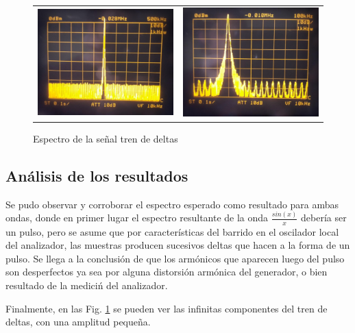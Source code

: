 \begin{figure}[H]
    \centering
    \begin{tabular}{c c}
        \includegraphics[scale=0.185]{../Mediciones/Ejercicio_8/ej8_espectro_deltas.jpeg} &
        \includegraphics[scale=0.18]{../Mediciones/Ejercicio_8/ej8_espectro_deltas_zoom.jpeg}
    \end{tabular}
    \caption{Espectro de la se\~nal tren de deltas}
    \label{fig:ej8_espectro_deltas}
\end{figure}

\subsection{An\'alisis de los resultados}
Se pudo observar y corroborar el espectro esperado como resultado para ambas ondas,
donde en primer lugar el espectro resultante de la onda $\frac{sin(x)}{x}$ deber\'ia ser un pulso,
pero se asume que por caracter\'isticas del barrido en el oscilador local del analizador, las muestras producen sucesivos deltas
que hacen a la forma de un pulso. Se llega a la conclusi\'on de que los arm\'onicos que aparecen luego del pulso son desperfectos
ya sea por alguna distorsi\'on arm\'onica del generador, o bien resultado de la medici\'n del analizador.

Finalmente, en las Fig. \ref{fig:ej8_espectro_deltas} se pueden ver las infinitas componentes del tren de deltas, con una amplitud
peque\~na.
